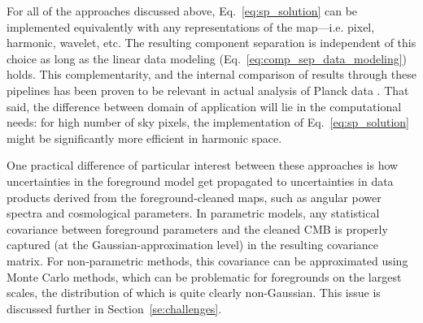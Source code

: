 For all of the approaches discussed above, Eq.~\ref{eq:sp_solution} can be implemented equivalently with any representations of the map---i.e. pixel, harmonic, wavelet, etc. The resulting component separation is independent of this choice as long as the linear data modeling (Eq.~\ref{eq:comp_sep_data_modeling}) holds. 
This complementarity, and the internal comparison of results through these pipelines has been proven to be relevant in actual analysis of Planck data \cite{Adam:2015tpy}. That said, the difference between domain of application will lie in the computational needs: for high number of sky pixels, the implementation of Eq.~\ref{eq:sp_solution} might be significantly more efficient in harmonic space. 

One practical difference of particular interest between these approaches is how uncertainties in the 
foreground model get propagated to uncertainties in data products derived from the foreground-cleaned
maps, such as angular power spectra and cosmological parameters. In parametric models, any statistical 
covariance between foreground parameters and the cleaned CMB is properly captured (at the 
Gaussian-approximation level) in the resulting covariance matrix. For non-parametric methods, this 
covariance can be approximated using Monte Carlo methods, which can be problematic for foregrounds
on the largest scales, the distribution of which is quite clearly non-Gaussian. This issue is discussed further
in Section~\ref{se:challenges}.


